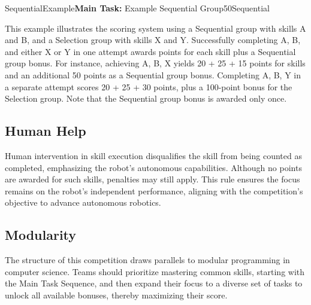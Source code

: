 \begin{Group}{SequentialExample}{\textbf{\textcolor{myturquoise}{Main Task:}} Example Sequential Group}{50}{Sequential}
\end{Group}
\setcounter{groupcounter}{0}

This example illustrates the scoring system using a Sequential group with skills A and B, and a Selection group with skills X and Y. Successfully completing A, B, and either X or Y in one attempt awards points for each skill plus a Sequential group bonus. For instance, achieving A, B, X yields 20 + 25 + 15 points for skills and an additional 50 points as a Sequential group bonus. Completing A, B, Y in a separate attempt scores 20 + 25 + 30 points, plus a 100-point bonus for the Selection group. Note that the Sequential group bonus is awarded only once.

\subsection*{Human Help}

Human intervention in skill execution disqualifies the skill from being counted as completed, emphasizing the robot's autonomous capabilities. Although no points are awarded for such skills, penalties may still apply. This rule ensures the focus remains on the robot's independent performance, aligning with the competition's objective to advance autonomous robotics.

\subsection*{Modularity}

The structure of this competition draws parallels to modular programming in computer science. Teams should prioritize mastering common skills, starting with the Main Task Sequence, and then expand their focus to a diverse set of tasks to unlock all available bonuses, thereby maximizing their score.
